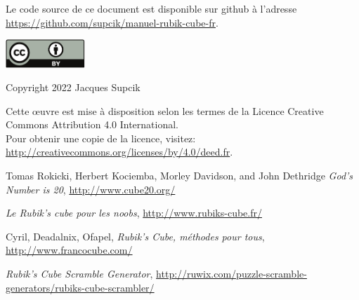 \documentclass[10pt,paper=a5,pagesize]{scrbook}
\begin{document}
\frontmatter
\thispagestyle{empty}

\begin{titlepage}

\end{titlepage}

\thispagestyle{empty}
\null
\vfill

Le code source de ce document est disponible sur github à l'adresse\\
\url{https://github.com/supcik/manuel-rubik-cube-fr}.
\par\vspace*{8mm}

\begin{minipage}[c]{\textwidth}
\begin{versionhistory}
\end{versionhistory}
\end{minipage}
\par\vspace*{10mm}


\includegraphics[width=30mm]{by.pdf}

Copyright \textcopyright{} 2022 Jacques Supcik

Cette œuvre est mise à disposition selon les termes de la Licence Creative Commons Attribution 4.0 International.
\medskip\\
Pour obtenir une copie de la licence, visitez:\\
\url{http://creativecommons.org/licenses/by/4.0/deed.fr}.
\newpage

\tableofcontents

\mainmatter







\backmatter
\begin{thebibliography}{9}
	
	 Tomas Rokicki, Herbert Kociemba, Morley Davidson, and John Dethridge
	\emph{God's Number is 20},
	\url{http://www.cube20.org/}

	\emph{Le Rubik's cube pour les noobs},
	\url{http://www.rubiks-cube.fr/}

	Cyril, Deadalnix, Ofapel,
	\emph{Rubik's Cube, méthodes pour tous},
	\url{http://www.francocube.com/}
	
	\emph{Rubik’s Cube Scramble Generator},
	\url{http://ruwix.com/puzzle-scramble-generators/rubiks-cube-scrambler/}
	
	
\end{thebibliography}
\end{document}
